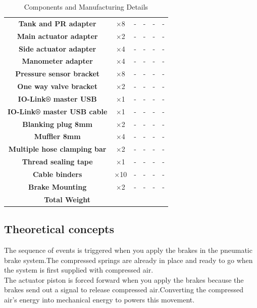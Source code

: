 \begin{table}[htbp]
\begin{adjustbox}{width=\textwidth}
\begin{tabular}{|c|c|c|c|c|c|}
\textbf{Tank and PR adapter} & $\times$8 & - & - & - & - \\
\textbf{Main actuator adapter} & $\times$2 & - & - & - & - \\
\textbf{Side actuator adapter} &$\times$4 & - & - & - & - \\
\textbf{Manometer adapter} & $\times$4 & - & - & - & - \\
\textbf{Pressure sensor bracket} & $\times$8 & - & - & - & - \\
\textbf{One way valve bracket} & $\times$2 & - & - & - & - \\
\textbf{IO-Link® master USB} &$\times$1 & - & - & - & - \\
\textbf{IO-Link® master USB cable} & $\times$1 & - & - & - & - \\
\textbf{Blanking plug 8mm} & $\times$2 & - & - & - & - \\
\textbf{Muffler 8mm} & $\times$4 & - & - & - & - \\
\textbf{Multiple hose clamping bar} & $\times$2 & - & - & - & - \\
\textbf{Thread sealing tape} & $\times$1 & - & - & - & - \\
\textbf{Cable binders} & $\times$10 & - & - & - & - \\
\textbf{Brake Mounting} & $\times$2 & - & - & - & - \\
\hline %
\multicolumn{2}{|c|}{\hspace{3cm}\large\textbf{Total Weight}} & \\
\cline{1-3} %
\end{tabular}
\end{adjustbox}
\caption{Components and Manufacturing Details}
\label{table:components}
\end{table}








\newpage
\subsection{Theoretical concepts}
\label{subsec:theoretical-concept}
The sequence of events is triggered when you apply the brakes in the pneumatic brake system.The compressed springs are already in place and ready to go when the system is first supplied with compressed air.\\

The actuator piston is forced forward when you apply the brakes because the brakes send out a signal to release compressed air.Converting the compressed air's energy into mechanical energy to powers this movement.\\

